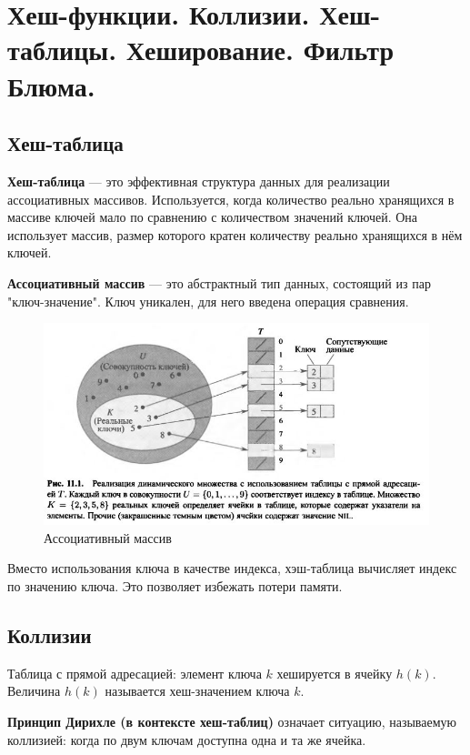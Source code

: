 \section{ Хеш-функции. Коллизии. Хеш-таблицы.  Хеширование. Фильтр Блюма.}

\subsection*{Хеш-таблица}
\textbf{Хеш-таблица} --- это эффективная структура данных для реализации ассоциативных массивов. Используется, когда количество реально хранящихся в массиве ключей мало по сравнению с количеством значений ключей. Она использует массив, размер которого кратен количеству реально хранящихся в нём ключей.

\textbf{Ассоциативный массив} --- это абстрактный тип данных, состоящий из пар "ключ-значение". Ключ уникален, для него введена операция сравнения.

\begin{figure}[h!]
	\centering
	\includegraphics[width=0.4\linewidth]{img_easy/11_2.png}
	\captionsetup{labelformat=empty}
	\caption{Ассоциативный массив}
\end{figure}

Вместо использования ключа в качестве индекса, хэш-таблица вычисляет индекс по значению ключа. Это позволяет избежать потери памяти.

\subsection*{Коллизии}
Таблица с прямой адресацией: элемент ключа $k$ хешируется в ячейку $h(k)$. Величина $h(k)$ называется хеш-значением ключа $k$.

\textbf{Принцип Дирихле (в контексте хеш-таблиц)} означает ситуацию, называемую коллизией: когда по двум ключам доступна одна и та же ячейка.

